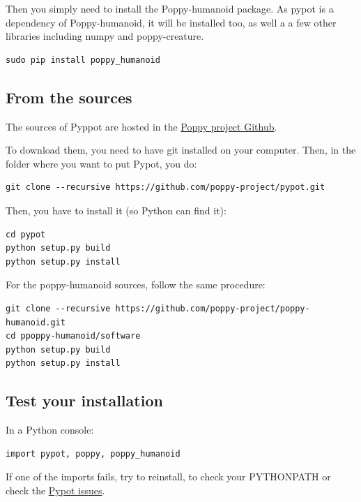 \documentclass{article}
\begin{document}
Then you simply need to install the Poppy-humanoid package. As pypot is a dependency of Poppy-humanoid, it will be installed too, as well a a few other libraries including numpy and poppy-creature.

\begin{verbatim}
sudo pip install poppy_humanoid
\end{verbatim}

\subsection{From the sources}

The sources of Pyppot are hosted in the \href{https://github.com/poppy-project/pypot}{Poppy project Github}.

To download them, you need to have git installed on your computer. Then, in the folder where you want to put Pypot, you do:

\begin{verbatim}
git clone --recursive https://github.com/poppy-project/pypot.git
\end{verbatim}

Then, you have to install it (so Python can find it):

\begin{verbatim}
cd pypot
python setup.py build
python setup.py install
\end{verbatim}

For the poppy-humanoid sources, follow the same procedure:

\begin{verbatim}
git clone --recursive https://github.com/poppy-project/poppy-humanoid.git
cd ppoppy-humanoid/software
python setup.py build
python setup.py install
\end{verbatim}

\subsection{Test your installation}

In a Python console:

\begin{verbatim}
import pypot, poppy, poppy_humanoid
\end{verbatim}

If one of the imports fails, try to reinstall, to check your PYTHONPATH or check the \href{https://github.com/poppy-project/pypot/issues}{Pypot issues}.
\end{document}
